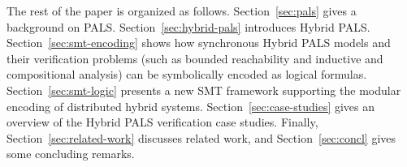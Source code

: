 

The rest of the paper is organized as follows.
%
Section~\ref{sec:pals} gives a background on  PALS.
Section~\ref{sec:hybrid-pals} introduces Hybrid PALS.
Section~\ref{sec:smt-encoding} shows how synchronous Hybrid PALS models 
and their verification problems (such as bounded reachability and inductive and compositional analysis)
can be symbolically encoded as logical formulas.
Section~\ref{sec:smt-logic} presents a new SMT framework supporting
the 
modular encoding of  distributed hybrid systems. %
Section~\ref{sec:case-studies} gives an overview of the Hybrid PALS verification case studies.
Finally,
Section~\ref{sec:related-work} discusses related work,
and 
Section~\ref{sec:concl} gives some concluding remarks.



